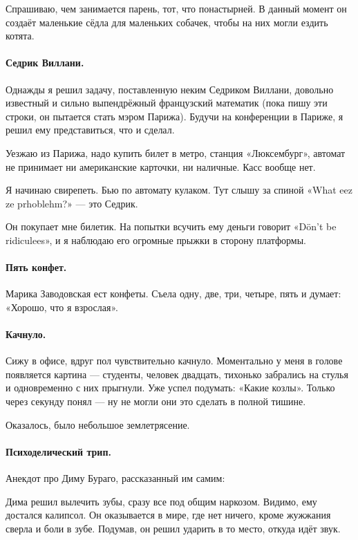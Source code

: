\documentclass{book}
\begin{document}
Спрашиваю, чем занимается парень, тот, что понастырней.
В данный момент он создаёт маленькие сёдла для маленьких собачек, чтобы на них могли ездить котята.

\paragraph{Седрик Виллани.}
Однажды я решил задачу, поставленную неким Седриком Виллани, довольно известный и сильно выпендрёжный французский математик (пока пишу эти строки, он пытается стать мэром Парижа).
Будучи на конференции в Париже, я решил ему представиться, что и сделал.

Уезжаю из Парижа, надо купить билет в метро, станция «Люксембург»,
автомат не принимает ни американские карточки, ни наличные.
Касс вообще нет.

Я начинаю свирепеть.
Бью по автомату кулаком.
Тут слышу за спиной «What eez ze prhoblehm?» --- это Седрик.

Он покупает мне билетик.
На попытки всучить ему деньги говорит «D\"{o}n't be ridiculees», и я наблюдаю его огромные прыжки в сторону платформы.

\paragraph{Пять конфет.}
Марика Заводовская ест конфеты. Съела одну, две, три, четыре, пять и думает: «Хорошо, что я взрослая».

\paragraph{Качнуло.}
Сижу в офисе, вдруг пол чувствительно качнуло.
Моментально у меня в голове появляется картина --- студенты, человек двадцать, тихонько забрались на стулья и одновременно с них прыгнули.
Уже успел подумать: «Какие козлы».
Только через секунду понял --- ну не могли они это сделать в полной тишине.

Оказалось, было небольшое землетрясение.

\paragraph{Психоделический трип.}
Анекдот про Диму Бураго, рассказанный им самим:

Дима решил вылечить зубы, сразу все под общим наркозом.
Видимо, ему достался калипсол.
Он оказывается в мире, где нет ничего, кроме жужжания сверла и боли в зубе.
Подумав, он решил ударить в то место, откуда идёт звук.
\end{document}
